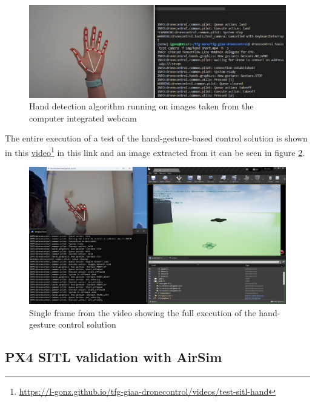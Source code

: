 \begin{figure}
  \centering
  \includegraphics[width=\textwidth, keepaspectratio]{img/sitl-hand.png}
  \caption{Hand detection algorithm running on images taken from the computer integrated webcam}\label{fig:sitl-hand}
\end{figure}

The entire execution of a test of the hand-gesture-based control solution is shown in this \href{https://l-gonz.github.io/tfg-giaa-dronecontrol/videos/test-sitl-hand}{video}\footnote{\url{https://l-gonz.github.io/tfg-giaa-dronecontrol/videos/test-sitl-hand}} in this link and an image extracted from it can be seen in figure \ref{fig:sitl-hand-video}.

\begin{figure}
  \centering
  \includegraphics[width=\textwidth, keepaspectratio]{img/video-hand-sitl.png}
  \caption{Single frame from the video showing the full execution of the hand-gesture control solution}
  \label{fig:sitl-hand-video}
\end{figure}


\subsection{PX4 SITL validation with AirSim}
\label{sec:test-3-airsim}

